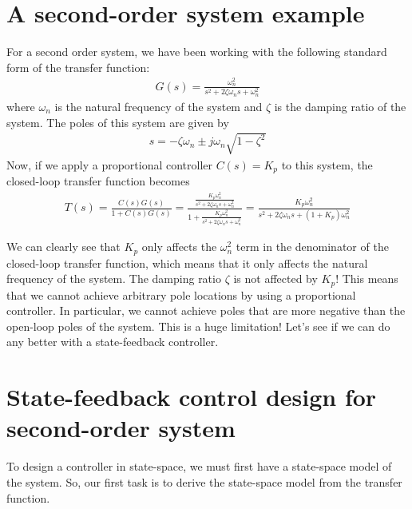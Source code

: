 \documentclass{ee122_notes}
\begin{document}
\section{A second-order system example}
For a second order system, we have been working with the following standard form of the transfer function:
\begin{align*}
    G(s) = \frac{\omega_n^2}{s^2 + 2\zeta \omega_n s + \omega_n^2}
\end{align*}
where $\omega_n$ is the natural frequency of the system and $\zeta$ is the damping ratio of the system. The poles of this system are given by
\begin{align*}
    s = -\zeta \omega_n \pm j \omega_n \sqrt{1 - \zeta^2}
\end{align*}
Now, if we apply a proportional controller $C(s) = K_p$ to this system, the closed-loop transfer function becomes
\begin{align*}
    T(s) = \frac{C(s)G(s)}{1 + C(s)G(s)} = \frac{\frac{K_p \omega_n^2}{s^2 + 2\zeta \omega_n s + \omega_n^2}}{1 + \frac{K_p \omega_n^2}{s^2 + 2\zeta \omega_n s + \omega_n^2}} = \frac{K_p \omega_n^2}{s^2 + 2\zeta \omega_n s + (1 + K_p)\omega_n^2}
\end{align*}

We can clearly see that $K_p$ only affects the $\omega_n^2$ term in the denominator of the closed-loop transfer function, which means that it only affects the natural frequency of the system. The damping ratio $\zeta$ is not affected by $K_p$! This means that we cannot achieve arbitrary pole locations by using a proportional controller. In particular, we cannot achieve poles that are more negative than the open-loop poles of the system. This is a huge limitation! Let's see if we can do any better with a state-feedback controller.

\section{State-feedback control design for second-order system}
To design a controller in state-space, we must first have a state-space model of the system. So, our first task is to derive the state-space model from the transfer function. 
\end{document}
